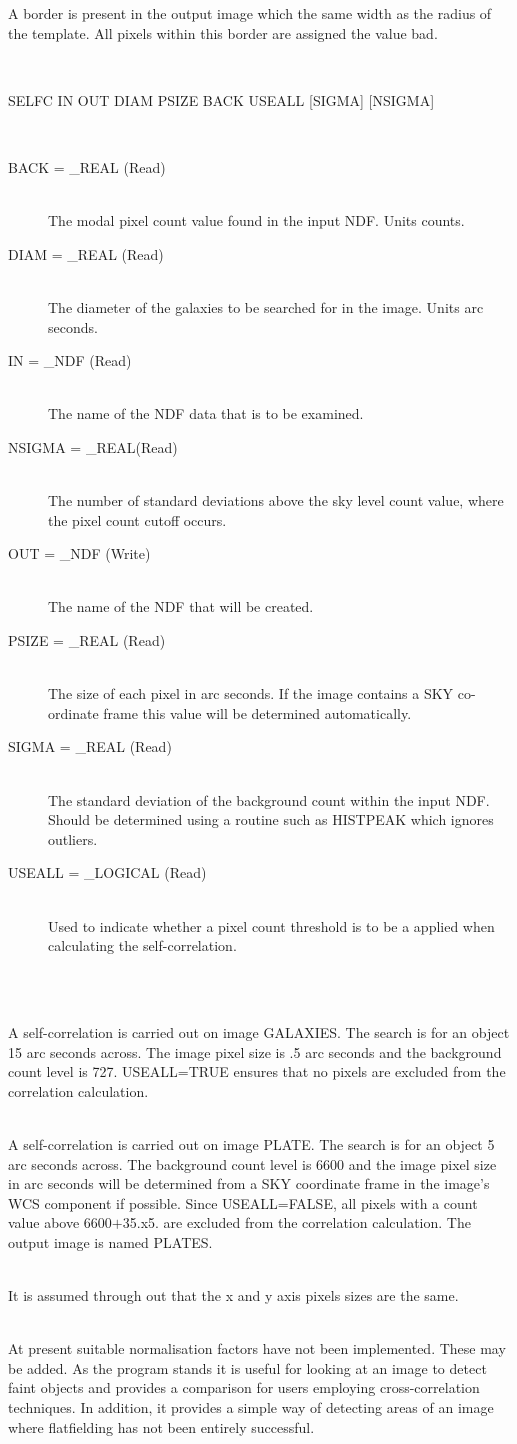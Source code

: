 \documentclass[twoside,11pt]{article}
\newcommand{\LineBreak}{\hfill\break\hbox{}\qquad}
\newlength{\sstexampleslength}
\newcommand{\sstusage}[1]{\item[Usage:] \mbox{}
\\[1.3ex]{\raggedright \ssttt #1}}
\newcommand{\sstparameters}[1]{
   \item[Parameters:] \mbox{} \\
   \vspace{-3.5ex}
   \begin{description}
      #1
   \end{description}
}
\newcommand{\sstexamples}[1]{
   \item[Examples:] \mbox{} \\
   \vspace{-3.5ex}
   \begin{description}
      #1
   \end{description}
}
\newcommand{\sstsubsection}[1]{ \item[{#1}] \mbox{} \\}
\newcommand{\sstexamplesubsection}[2]{\sloppy
\item[\parbox{\sstexampleslength}{\ssttt #1}] \mbox{} \vspace{1.0ex}
\\ #2 }
\newcommand{\sstnotes}[1]{\item[Notes:] \mbox{} \\[1.3ex] #1}
\newcommand{\sstimplementationstatus}[1]{
   \item[{Implementation Status:}] \mbox{} \\[1.3ex] #1}
\newcommand{\sstusage}[1]{\item[Usage:]
      \begin{description}
         {\ssttt #1}
      \end{description}
      \\
   }
\newcommand{\sstparameters}[1]{
      \item[Parameters:] \\
      \begin{description}
         #1
      \end{description}
      \\
   }
\newcommand{\sstexamples}[1]{
      \item[Examples:] \\
      \begin{description}
         #1
      \end{description}
      \\
   }
\newcommand{\sstsubsection}[1]{\item[{#1}]}
\newcommand{\sstexamplesubsection}[2]{\item[{\ssttt #1}] #2}
\newcommand{\sstnotes}[1]{\item[Notes:] #1 }
\newcommand{\sstimplementationstatus}[1]{
      \item[Implementation Status:] #1
   }
\begin{document}
{{      A border is present in the output image which the same width
      as the radius of the template. All pixels within this border
      are assigned the value bad.
   }
   \sstusage{
      SELFC IN OUT DIAM PSIZE BACK USEALL [SIGMA] [NSIGMA]
   }
   \sstparameters{
      \sstsubsection{
         BACK = \_REAL (Read)
      }{
         The modal pixel count value found in the input NDF.
         Units counts.
      }
      \sstsubsection{
         DIAM = \_REAL (Read)
      }{
         The diameter of the galaxies to be searched for in the
         image. Units arc seconds.
      }
      \sstsubsection{
         IN = \_NDF (Read)
      }{
         The name of the NDF data that is to be examined.
      }
      \sstsubsection{
         NSIGMA = \_REAL(Read)
      }{
         The number of standard deviations above the sky level
         count value, where the pixel count cutoff occurs.
      }
      \sstsubsection{
         OUT = \_NDF (Write)
      }{
         The name of the NDF that will be created.
      }
      \sstsubsection{
         PSIZE = \_REAL (Read)
      }{
         The size of each pixel in arc seconds.  If the image contains
         a SKY co-ordinate frame this value will be determined
         automatically.
      }
      \sstsubsection{
         SIGMA = \_REAL (Read)
      }{
         The standard deviation of the background count within the
         input NDF. Should be determined using a routine such as
         HISTPEAK which ignores outliers.
      }
      \sstsubsection{
         USEALL = \_LOGICAL (Read)
      }{
         Used to indicate whether a pixel count threshold is to
         be a applied when calculating the self-correlation.
      }
   }
   \sstexamples{
      \sstexamplesubsection{
         selfc in=search out=scorr diam=15. psize=0.5 back=727.
\LineBreak
            useall=true
      }{
         A self-correlation is carried out on image GALAXIES. The
         search is for an object 15 arc seconds across. The image
         pixel size is .5 arc seconds and the background count level
         is 727. USEALL=TRUE ensures that no pixels are excluded from
         the correlation calculation.
      }
      \sstexamplesubsection{
         selfc in=plate out=plates diam=5. back=6600.
\LineBreak
            useall=false sigma=35. nsigma=5.
      }{
         A self-correlation is carried out on image PLATE. The search
         is for an object 5 arc seconds across.  The background count
         level is 6600 and the image pixel size in arc seconds will
         be determined from a SKY coordinate frame in the image's WCS
         component if possible.  Since USEALL=FALSE, all pixels with
         a count value above 6600$+$35.x5. are excluded from the
         correlation calculation.  The output image is named PLATES.
      }
   }
   \sstnotes{
      It is assumed through out that the x and y axis pixels
      sizes are the same.
   }
   \sstimplementationstatus{
      At present suitable normalisation factors have not been
      implemented. These may be added. As the program stands it is
      useful for looking at an image to detect faint objects and
      provides a comparison for users employing cross-correlation
      techniques. In addition, it provides a simple way of detecting
      areas of an image where flatfielding has not been entirely
      successful.
   }
}
\end{document}
